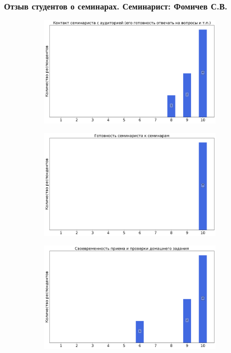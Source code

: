     \subsubsection{Отзыв студентов о семинарах. Семинарист: Фомичев С.В.}
		\begin{figure}[H]
			\centering
			\begin{subfigure}[b]{0.45\textwidth}
				\centering
				\includegraphics[width=\textwidth]{images/3 course/Теория поля/seminarists-marks-Фомичев С.В.-0.png}
			\end{subfigure}
			\begin{subfigure}[b]{0.45\textwidth}
				\centering
				\includegraphics[width=\textwidth]{images/3 course/Теория поля/seminarists-marks-Фомичев С.В.-1.png}
			\end{subfigure}
			\begin{subfigure}[b]{0.45\textwidth}
				\centering
				\includegraphics[width=\textwidth]{images/3 course/Теория поля/seminarists-marks-Фомичев С.В.-2.png}

\end{subfigure}
\end{figure}
